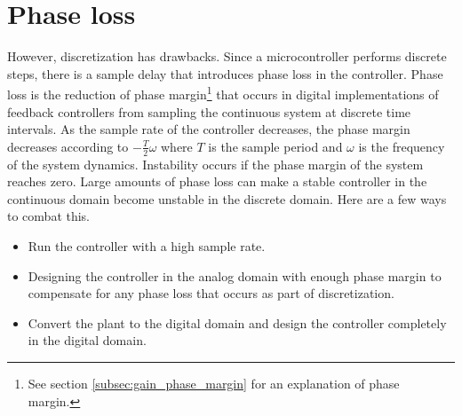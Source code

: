 \section{Phase loss}

However, \gls{discretization} has drawbacks. Since a microcontroller performs
discrete steps, there is a sample delay that introduces phase loss in the
controller. Phase loss is the reduction of \gls{phase margin}\footnote{See
section \ref{subsec:gain_phase_margin} for an explanation of phase margin.} that
occurs in digital implementations of feedback controllers from sampling the
continuous \gls{system} at discrete time intervals. As the sample rate of the
controller decreases, the \gls{phase margin} decreases according to
$-\frac{T}{2}\omega$ where $T$ is the sample period and $\omega$ is the
frequency of the \gls{system} dynamics. Instability occurs if the
\gls{phase margin} of the \gls{system} reaches zero. Large amounts of phase loss
can make a stable controller in the continuous domain become unstable in the
discrete domain. Here are a few ways to combat this.
\begin{itemize}
  \item Run the controller with a high sample rate.
  \item Designing the controller in the analog domain with enough
    \gls{phase margin} to compensate for any phase loss that occurs as part of
    \gls{discretization}.
  \item Convert the \gls{plant} to the digital domain and design the controller
    completely in the digital domain.
\end{itemize}
